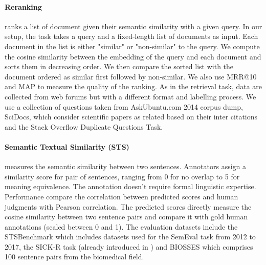 \paragraph{Reranking} ranks a list of document given their semantic similarity with a given query. In our setup, the task takes a query and a fixed-length list of documents as input. Each document in the list is either "similar" or "non-similar" to the query. We compute the cosine similarity between the embedding of the query and each document and sorts them in decreasing order. We then compare the sorted list with the document ordered as similar first followed by non-similar. We also use MRR@10 and MAP to measure the quality of the ranking. As in the retrieval task, data are collected from web forums but with a different format and labelling process. We use a collection of questions taken from AskUbuntu.com 2014 corpus dump, SciDocs, which consider scientific papers as related based on their inter citations  and the Stack Overflow Duplicate Questions Task.

\paragraph{Semantic Textual Similarity (STS)} measures the semantic similarity between two sentences. Annotators assign a similarity score for pair of sentences, ranging from 0 for no overlap to 5 for meaning equivalence. The annotation doesn't require formal linguistic expertise. Performance compare the correlation between predicted scores and human judgments with Pearson correlation. The predicted scores directly measure the cosine similarity between two sentence pairs and compare it with gold human annotations (scaled between 0 and 1). The evaluation datasets include the STSBenchmark which includes datasets used for the SemEval task from 2012 to 2017, the SICK-R task (already introduced in ) and BIOSSES  which comprises 100 sentence pairs from the biomedical field.


